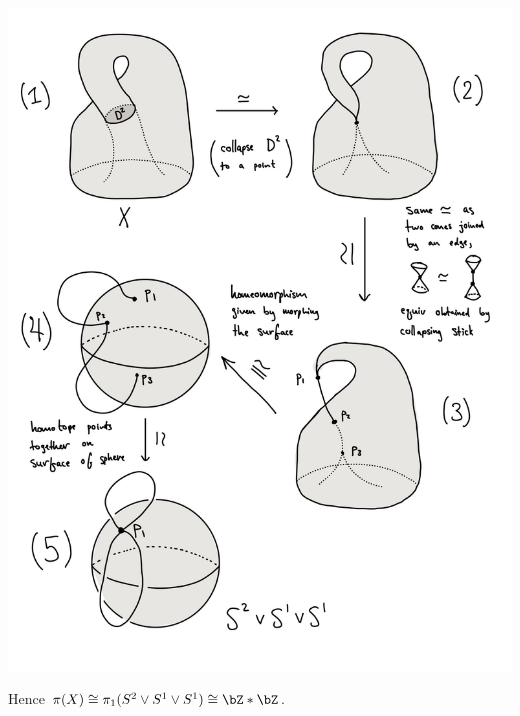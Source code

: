 \begin{homework}[e]
\begin{prf}
\begin{center}
      \includegraphics[width=14cm]{figures/hwk4-fig6.jpg}
      \label{fig:prob12.1}
    \end{center}
    Hence $\pi(X) \cong \pi_1(S^2 \vee S^1 \vee S^1) \cong \bZ \ast \bZ$.


\end{prf}
\end{homework}
